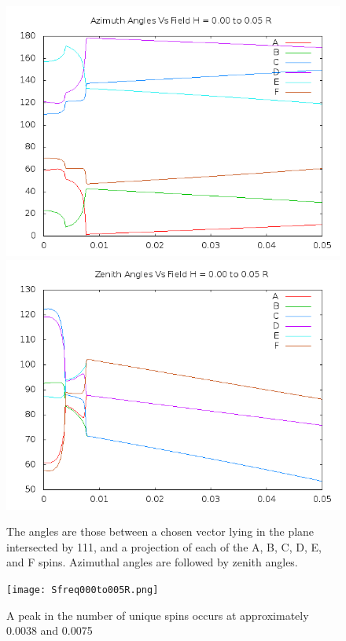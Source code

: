\documentclass{article}
\begin{document}
\begin{figure}
\centering
\includegraphics[scale=0.5]{azim000to005R.png}
\includegraphics[scale=0.5]{zen000to005R.png}
\caption{The angles are those between a chosen vector lying in the plane intersected by 111,
and a projection of each of the A, B, C, D, E, and F spins. Azimuthal angles are followed by zenith angles.}
\end{figure}

\pagebreak

\begin{center}
\vspace*{\fill}
\begin{figure}
 \texttt{[image: Sfreq000to005R.png]}
 \caption{A peak in the number of unique spins occurs at approximately 0.0038 and 0.0075}
\end{figure}
\vspace*{\fill}
\end{center}
\pagebreak
\end{document}

